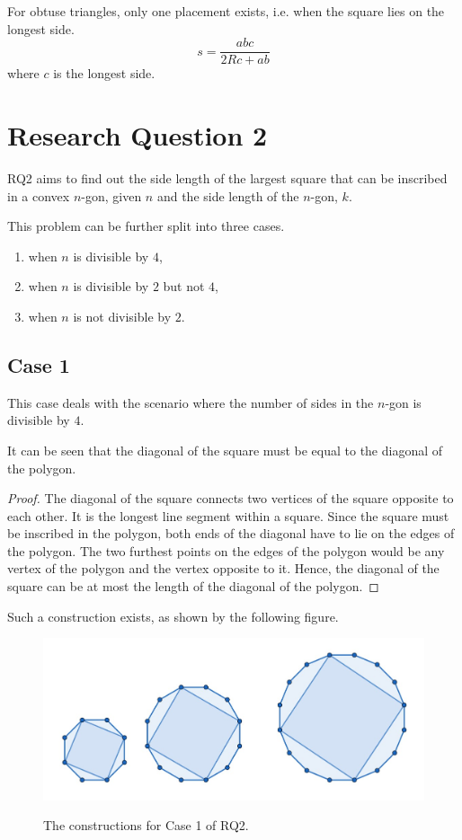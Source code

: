 \documentclass[12pt]{scrartcl}
\begin{document}
For obtuse triangles, only one placement exists, i.e. when the square lies on the longest side.
\begin{equation}
	s = \dfrac{abc}{2Rc+ab}
\end{equation}
where $c$ is the longest side.

\section{Research Question 2}

RQ2 aims to find out the side length of the largest square that can be inscribed in a convex $n$-gon,
given $n$ and the side length of the $n$-gon, $k$.

This problem can be further split into three cases.
\begin{enumerate}
	\item when $n$ is divisible by $4$,
	\item when $n$ is divisible by $2$ but not $4$,
	\item when $n$ is not divisible by $2$.
\end{enumerate}

\subsection{Case 1}
This case deals with the scenario where the number of sides in the $n$-gon is
divisible by $4$.

It can be seen that the diagonal of the square must be equal to the diagonal of the polygon.
\begin{proof}
	The diagonal of the square connects two vertices of the square opposite to each other.
	It is the longest line segment within a square.
	Since the square must be inscribed in the polygon, both ends of the diagonal have to lie on the edges of the polygon.
	The two furthest points on the edges of the polygon would be any vertex of the polygon and the vertex opposite to it.
	Hence, the diagonal of the square can be at most the length of the diagonal of the polygon.
\end{proof}

Such a construction exists, as shown by the following figure.
\begin{figure}[htpb]
	\centering
	\includegraphics[scale=.65]{images/rq2_1_1.jpg}
	\label{fig:rq2_1_1_img}
	\caption{The constructions for Case 1 of RQ2.}
\end{figure}
\end{document}
